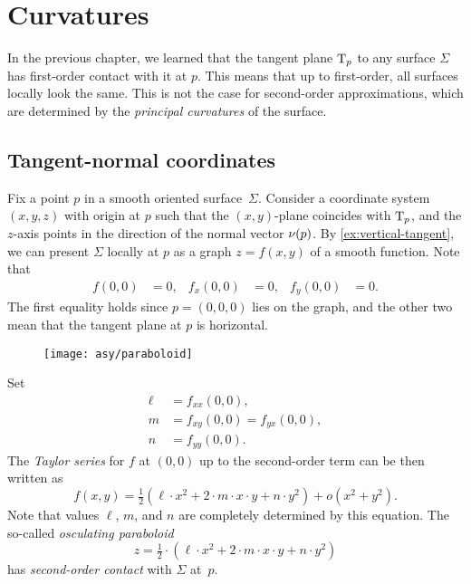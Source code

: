 \chapter{Curvatures}
\label{chap:surface-curvature}

In the previous chapter, we learned that the tangent plane $\mathrm{T}_p$ to any surface $\Sigma$ has first-order contact with it at $p$. This means that up to first-order, all surfaces locally look the same. This is not the case for second-order approximations, which are determined by the {}\emph{principal curvatures} of the surface.

\section{Tangent-normal coordinates} \label{sec:lmn}

Fix a point $p$ in a smooth oriented surface~$\Sigma$.
Consider a coordinate system $(x,y,z)$ with origin at $p$ such that the $(x,y)$-plane coincides with $\mathrm{T}_p$, and the $z$-axis points in the direction of the normal vector $\nu(p)$.
By \ref{ex:vertical-tangent}, we can present $\Sigma$ locally at $p$ as a graph $z=f(x,y)$ of a smooth function. 
Note that 
\begin{align*}
f(0,0)&=0,
&
f_x(0,0)&=0,
&
f_y(0,0)&=0.
\end{align*}
The first equality holds since $p=(0,0,0)$ lies on the graph, and the other two mean that the tangent plane at $p$ is horizontal.


\begin{wrapfigure}[7]{o}{42 mm}
\vskip-4mm
\centering
\texttt{[image: asy/paraboloid]}
\vskip-3mm
\end{wrapfigure}

Set 
\begin{align*}
\ell&=f_{xx}(0,0),
\\
m&=f_{xy}(0,0)=f_{yx}(0,0),
\\
n&=f_{yy}(0,0).
\end{align*}
The {}\emph{Taylor series} 
for $f$ at $(0,0)$ up to the second-order term can be then written as
\[f(x,y)=\tfrac12(\ell\cdot x^2+2\cdot m\cdot x\cdot y+n\cdot y^2)+o(x^2+y^2).\]
Note that values $\ell$, $m$, and $n$ are completely determined by this equation.
The so-called \emph{osculating paraboloid}
\[z=\tfrac12\cdot(\ell\cdot x^2+2\cdot m\cdot x\cdot y+n\cdot y^2)\]
has \emph{second-order contact} with $\Sigma$ at~$p$.

